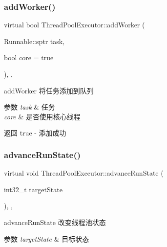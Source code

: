 \subsubsection{\texorpdfstring{add\+Worker()}{addWorker()}\hspace{0.1cm}{\footnotesize\ttfamily [2/2]}}
{\footnotesize\ttfamily virtual bool Thread\+Pool\+Executor\+::add\+Worker (\begin{DoxyParamCaption}\item[{Runnable\+::sptr}]{task,  }\item[{bool}]{core = {\ttfamily true} }\end{DoxyParamCaption})\hspace{0.3cm}{\ttfamily [final]}, {\ttfamily [protected]}, {\ttfamily [virtual]}}



add\+Worker 将任务添加到队列 


\begin{DoxyParams}{参数}
{\em task} & 任务 \\
\hline
{\em core} & 是否使用核心线程\\
\hline
\end{DoxyParams}
\begin{DoxyReturn}{返回}
true -\/ 添加成功 
\end{DoxyReturn}
\mbox{\label{classThreadPoolExecutor_abaa3926310766a93b7fe1d83b77efdae}} 
\subsubsection{\texorpdfstring{advance\+Run\+State()}{advanceRunState()}}
{\footnotesize\ttfamily virtual void Thread\+Pool\+Executor\+::advance\+Run\+State (\begin{DoxyParamCaption}\item[{int32\+\_\+t}]{target\+State }\end{DoxyParamCaption})\hspace{0.3cm}{\ttfamily [final]}, {\ttfamily [protected]}, {\ttfamily [virtual]}}



advance\+Run\+State 改变线程池状态 


\begin{DoxyParams}{参数}
{\em target\+State} & 目标状态 \\
\hline
\end{DoxyParams}
\mbox{\label{classThreadPoolExecutor_a5e40839bf4191b5eab9d81227ddb62c3}} 
